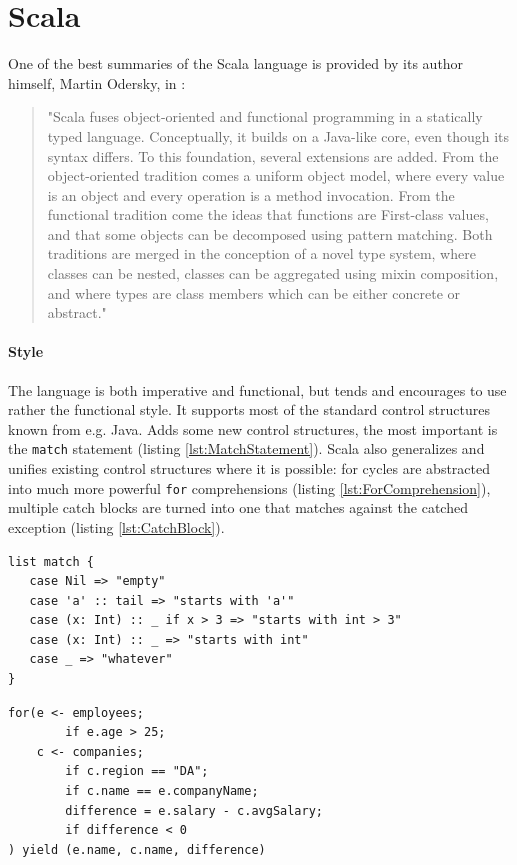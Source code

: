\documentclass[12pt,a4paper]{report}
\begin{document}
\section{Scala}

One of the best summaries of the Scala language is provided by its author himself, Martin Odersky, in \cite{ScalableComponents}:

\begin{quote}
"Scala fuses object-oriented and functional programming in a statically typed language. Conceptually, it builds on a Java-like core, even though its syntax differs. To this foundation, several extensions are added. From the object-oriented tradition comes a uniform object model, where every value is an object and every operation is a method invocation. From the functional tradition come the ideas that functions are First-class values, and that some objects can be decomposed using pattern matching. Both traditions are merged in the conception of a novel type system, where classes can be nested, classes can be aggregated using mixin composition, and where types are class members which can be either concrete or abstract."
\end{quote}

\paragraph{Style} The language is both imperative and functional, but tends and encourages to use rather the functional style. It supports most of the standard control structures known from e.g. Java. Adds some new control structures, the most important is the \texttt{match} statement (listing \ref{lst:MatchStatement}). Scala also generalizes and unifies existing control structures where it is possible: for cycles are abstracted into much more powerful \texttt{for} comprehensions (listing \ref{lst:ForComprehension}), multiple catch blocks are turned into one that matches against the catched exception (listing \ref{lst:CatchBlock}).

\begin{lstlisting}[frame=single,caption={Match statement.},label={lst:MatchStatement}]
list match {
   case Nil => "empty"
   case 'a' :: tail => "starts with 'a'"
   case (x: Int) :: _ if x > 3 => "starts with int > 3"
   case (x: Int) :: _ => "starts with int"
   case _ => "whatever"
}
\end{lstlisting}

\begin{lstlisting}[frame=single,caption={For comprehension.},label={lst:ForComprehension}]
for(e <- employees;
        if e.age > 25;
    c <- companies;
        if c.region == "DA";
        if c.name == e.companyName;
        difference = e.salary - c.avgSalary;
        if difference < 0		
) yield (e.name, c.name, difference)
\end{lstlisting}
\end{document}
